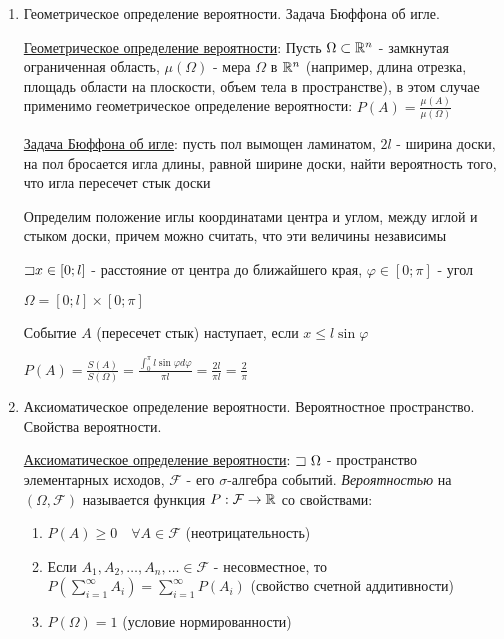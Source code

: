 \documentclass[12pt]{article}
\begin{document}
\begin{enumerate}
    \item Геометрическое определение вероятности. Задача Бюффона об игле.

    \hyperlink{geometricdefinitionofprobability}{Геометрическое определение вероятности}: Пусть $\Omega \subset \mathbb{R}^n$ - замкнутая ограниченная область,
    $\mu(\Omega)$ - мера $\Omega$ в $\mathbb{R}^n$ (например, длина отрезка, площадь области на плоскости, объем тела в пространстве), в этом случае применимо геометрическое определение вероятности: $P(A) = \frac{\mu(A)}{\mu(\Omega)}$

    \hyperlink{buffonsproblem}{Задача Бюффона об игле}: пусть пол вымощен ламинатом, $2l$ - ширина доски, на пол бросается игла длины, равной ширине доски,
    найти вероятность того, что игла пересечет стык доски

    Определим положение иглы координатами центра и углом, между иглой и стыком доски, причем можно считать, что эти величины независимы

    $\mathord{\sqsupset} x \in [0; l]$ - расстояние от центра до ближайшего края, $\varphi \in [0; \pi]$ - угол

    $\Omega = [0; l] \times [0; \pi]$

    Событие $A$ (пересечет стык) наступает, если $x \leq l \sin \varphi$

    $P(A) = \frac{S(A)}{S(\Omega)} = \frac{\int_0^\pi l \sin \varphi d \varphi}{\pi l} = \frac{2l}{\pi l} = \frac{2}{\pi}$

    \item Аксиоматическое определение вероятности. Вероятностное пространство. Свойства вероятности.

    \hyperlink{axiomaticdefinitionofprobability}{Аксиоматическое определение вероятности}: $\letsymbol\ \Omega$ - пространство элементарных исходов, $\mathcal{F}$ - его $\sigma$-алгебра событий.
    \textit{Вероятностью} на $(\Omega, \mathcal{F})$ называется функция $P: \mathcal{F} \to \mathbb{R}$ со свойствами:

    \begin{enumerate}
        \item $P(A) \geq 0 \quad \forall A \in \mathcal{F}$ (неотрицательность)

        \item Если $A_1, A_2, \dots, A_n, \dots \in \mathcal{F}$ - несовместное, то $P(\sum_{i = 1}^\infty A_i) = \sum_{i = 1}^\infty P(A_i)$ (свойство счетной аддитивности)

        \item $P(\Omega) = 1$ (условие нормированности)
    \end{enumerate}


\end{enumerate}
\end{document}
